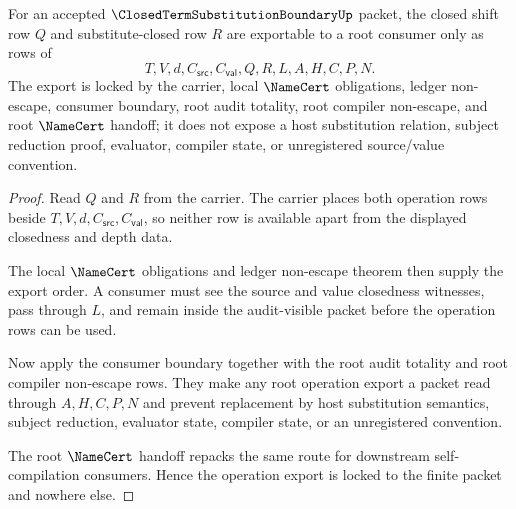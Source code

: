 \begin{theorem}
\label{thm:closed-term-substitution-boundary-root-operation-export-lock}
For an accepted $\ClosedTermSubstitutionBoundaryUp$ packet, the closed shift row $Q$ and substitute-closed row $R$ are exportable to a root consumer only as rows of
$$
T,V,d,C_{\mathsf{src}},C_{\mathsf{val}},Q,R,L,A,H,C,P,N.
$$
The export is locked by the carrier, local $\NameCert$ obligations, ledger non-escape, consumer boundary, root audit totality, root compiler non-escape, and root $\NameCert$ handoff; it does not expose a host substitution relation, subject reduction proof, evaluator, compiler state, or unregistered source/value convention.
\end{theorem}
\begin{proof}
Read $Q$ and $R$ from the carrier. The carrier places both operation rows beside $T,V,d,C_{\mathsf{src}},C_{\mathsf{val}}$, so neither row is available apart from the displayed closedness and depth data.

The local $\NameCert$ obligations and ledger non-escape theorem then supply the export order. A consumer must see the source and value closedness witnesses, pass through $L$, and remain inside the audit-visible packet before the operation rows can be used.

Now apply the consumer boundary together with the root audit totality and root compiler non-escape rows. They make any root operation export a packet read through $A,H,C,P,N$ and prevent replacement by host substitution semantics, subject reduction, evaluator state, compiler state, or an unregistered convention.

The root $\NameCert$ handoff repacks the same route for downstream self-compilation consumers. Hence the operation export is locked to the finite packet and nowhere else.
\end{proof}

